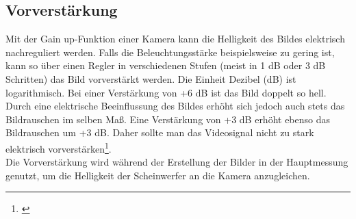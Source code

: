 \subsection{Vorverstärkung}
\label{sec_gain}
Mit der \glqq Gain up\grqq -Funktion einer Kamera kann die Helligkeit des Bildes elektrisch nachreguliert werden. Falls die Beleuchtungsstärke beispielsweise zu gering ist, kann so über einen Regler in verschiedenen Stufen (meist in 1 dB oder 3 dB Schritten) das Bild vorverstärkt werden. Die Einheit Dezibel (dB) ist logarithmisch. Bei einer Verstärkung von +6 dB ist das Bild doppelt so hell. Durch eine elektrische Beeinflussung des Bildes erhöht sich jedoch auch stets das Bildrauschen im selben Maß. Eine Verstärkung von +3 dB erhöht ebenso das Bildrauschen um +3 dB. Daher sollte man das Videosignal nicht zu stark elektrisch vorverstärken\footnote{\cite[406-407]{schmidt}}.\\
Die Vorverstärkung wird während der Erstellung der Bilder in der Hauptmessung genutzt, um die Helligkeit der Scheinwerfer an die Kamera anzugleichen.

